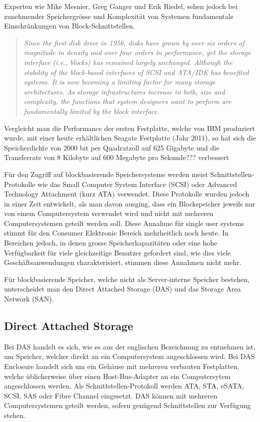 Experten wie Mike Mesnier, Greg Ganger und Erik Riedel, sehen jedoch bei zunehmender Speichergrösse und Komplexität von Systemen fundamentale Einschränkungen von Block-Schnittstellen.

\begin{quotation}
\em Since the first disk drive in 1956, disks have grown by over six orders of magnitude in density and over four orders in performance, yet the storage interface (i.e., blocks) has remained largely unchanged. Although the stability of the block-based interfaces of SCSI and ATA/IDE has benefited systems. It is now becoming a limiting factor for many storage architectures. As storage infrastructures increase in both, size and complexity, the functions that system designers want to perform are fundamentally limited by the block interface. \end{quotation}\cite{Mesnier2003}

Vergleicht man die Performance der ersten Festplatte, welche von IBM produziert wurde, mit einer heute erhältlichen Seagate Festplatte (Jahr 2011), so hat sich die Speicherdichte von 2000 bit per Quadratzoll auf 625 Gigabyte und die Transferrate von 8 Kilobyte auf 600 Megabyte pro Sekunde??? verbessert\cite{Seagate2011}\cite{Seagate2011a}

Für den Zugriff auf blockbasierende Speichersysteme werden meist Schnittstellen-Protokolle wie das Small Computer System Interface (SCSI) oder Advanced Technology Attachment (kurz \gls{ATA}) verwendet. Diese Protokolle wurden jedoch in einer Zeit entwickelt, als man davon ausging, dass ein Blockspeicher jeweils nur von einem Computersystem verwendet wird und nicht mit mehreren Computersystemen geteilt werden soll. Diese Annahme für single user systems stimmt für den Consumer Elektronic Bereich mehrheitlich noch heute. In Bereichen jedoch, in denen grosse Speicherkapazitäten oder eine hohe Verfügbarkeit für viele gleichzeitige Benutzer gefordert sind, wie dies viele Geschäftsanwendungen charakterisiert, stimmen diese Annahmen nicht mehr.

Für blockbasierende Speicher, welche nicht als Server-interne Speicher bestehen, unterscheidet man den Direct Attached Storage (DAS) und das Storage Area Network (SAN). 

\subsection{Direct Attached Storage}
Bei DAS handelt es sich, wie es aus der englischen Bezeichnung zu entnehmen ist, um Speicher, welcher direkt an ein Computersystem angeschlossen wird. Bei DAS Enclosure handelt sich um ein Gehäuse mit mehreren verbauten Festplatten, welche üblicherweise über einen Host-Bus-Adapter an ein Computersytem angeschlossen werden. Als Schnittstellen-Protokoll werden \gls{ATA}, \gls{STA}, \gls{eSATA}, \gls{SCSI}, \gls{SAS} oder Fibre Channel eingesetzt. DAS können mit mehreren Computersystemen geteilt werden, sofern genügend Schnittstellen zur Verfügung stehen.

